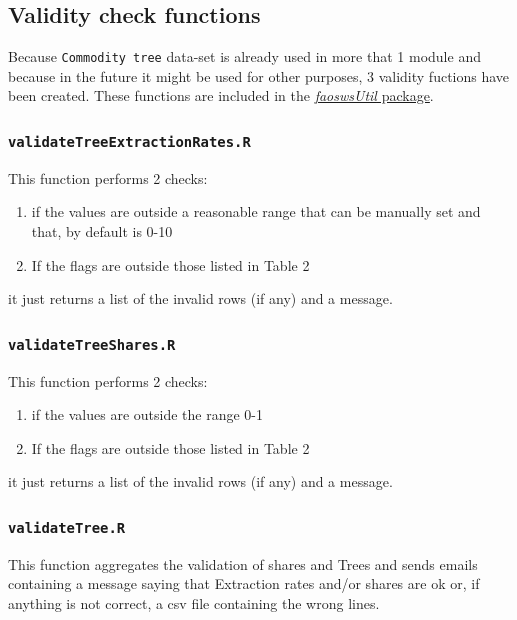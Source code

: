 \documentclass[]{article}
\providecommand{\tightlist}{%
  \setlength{\itemsep}{0pt}\setlength{\parskip}{0pt}}
\begin{document}
\subsection{Validity check functions}\label{validity-check-functions}

Because \texttt{Commodity\ tree} data-set is already used in more that 1
module and because in the future it might be used for other purposes, 3
validity fuctions have been created. These functions are included in the
\href{https://sdlc.fao.org/bitbucket/projects/SWS/repos/faoswsutil/browse/R}{\emph{faoswsUtil}
package}.

\subsubsection{\texorpdfstring{\texttt{validateTreeExtractionRates.R}}{validateTreeExtractionRates.R}}\label{validatetreeextractionrates.r}

This function performs 2 checks:

\begin{enumerate}
\def\labelenumi{\arabic{enumi}.}
\tightlist
\item
  if the values are outside a reasonable range that can be manually set
  and that, by default is 0-10
\item
  If the flags are outside those listed in Table 2
\end{enumerate}

it just returns a list of the invalid rows (if any) and a message.

\subsubsection{\texorpdfstring{\texttt{validateTreeShares.R}}{validateTreeShares.R}}\label{validatetreeshares.r}

This function performs 2 checks:

\begin{enumerate}
\def\labelenumi{\arabic{enumi}.}
\tightlist
\item
  if the values are outside the range 0-1
\item
  If the flags are outside those listed in Table 2
\end{enumerate}

it just returns a list of the invalid rows (if any) and a message.

\subsubsection{\texorpdfstring{\texttt{validateTree.R}}{validateTree.R}}\label{validatetree.r}

This function aggregates the validation of shares and Trees and sends
emails containing a message saying that Extraction rates and/or shares
are ok or, if anything is not correct, a csv file containing the wrong
lines.
\end{document}
